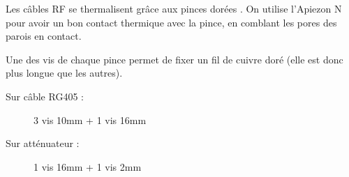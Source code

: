 Les câbles RF se thermalisent grâce aux pinces dorées . On utilise l'Apiezon N pour avoir un bon contact thermique avec la pince, en comblant les pores des parois en contact.

Une des vis de chaque pince permet de fixer un fil de cuivre doré (elle est donc plus longue que les autres).

\begin{description}
    \item[Sur câble RG405 :] 3 vis 10mm + 1 vis 16mm
    \item[Sur atténuateur :] 1 vis 16mm + 1 vis 2mm
\end{description}
